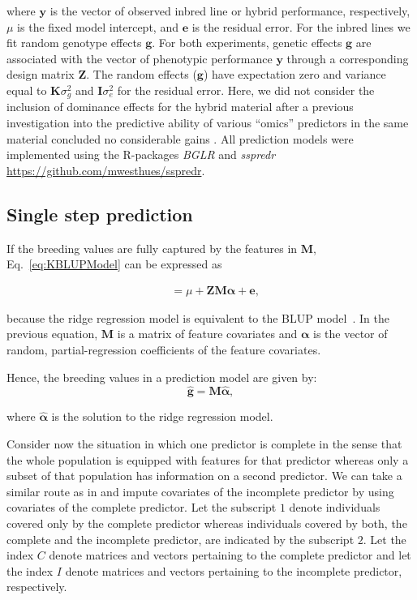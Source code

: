 \documentclass[12pt,titlepage]{article}
\begin{document}
where $\mathbf{y}$ is the vector of observed inbred line or hybrid performance,
respectively, $\mu$ is the fixed model intercept, and $\mathbf{e}$ is the 
residual error.
For the inbred lines we fit random genotype effects $\mathbf{g}$.
For both experiments, genetic effects $\mathbf{g}$ are associated with the
vector of phenotypic performance $\mathbf{y}$ through a corresponding design
matrix $\mathbf{Z}$.
The random effects ($\mathbf{g}$) have expectation zero and variance equal to
$\mathbf{K} \sigma^{2}_{g}$ and $\mathbf{I} \sigma^2_{e}$ for the residual
error.
Here, we did not consider the inclusion of dominance effects for the hybrid
material after a previous investigation into the predictive ability of various
``omics'' predictors in the same material concluded no considerable gains 
\cite{Westhues2017}.
All prediction models were implemented using the R-packages \textit{BGLR}
\cite{Perez2014} and \textit{sspredr}
\url{https://github.com/mwesthues/sspredr}.


\subsection{Single step prediction}
If the breeding values are fully captured by the features in $\mathbf{M}$,
Eq.~\ref{eq:KBLUPModel} can be expressed as

\begin{align} \label{eq:KBLUPModelSimplified}
	&= \mu + \mathbf{Z} \mathbf{M} \boldsymbol{\alpha} + \boldsymbol{e},
\end{align}

\cite{Fernando2014} because the ridge regression model is equivalent to the
BLUP model~\cite{Ruppert2003}.
In the previous equation, $\mathbf{M}$ is a matrix of feature covariates and
$\boldsymbol{\alpha}$ is the vector of random, partial-regression coefficients
of the feature covariates.


Hence, the breeding values in a prediction model are given by:
\begin{equation} \label{eq:mrnaebv}
	\mathbf{\hat{g}} = \mathbf{M}\boldsymbol{\hat{\alpha}},
\end{equation}

where $\boldsymbol{\hat{\alpha}}$ is the solution to the ridge regression model.

Consider now the situation in which one predictor is complete in the sense that
the whole population is equipped with features for that predictor whereas only
a subset of that population has information on a second predictor.
We can take a similar route as in  and impute covariates 
of the incomplete predictor by using covariates of the complete predictor.
Let the subscript $1$ denote individuals covered only by the complete
predictor whereas individuals covered by both, the complete and the
incomplete predictor, are indicated by the subscript $2$.
Let the index $C$ denote matrices and vectors pertaining to the complete
predictor and let the index $I$ denote matrices and vectors pertaining to the
incomplete predictor, respectively.
\end{document}
